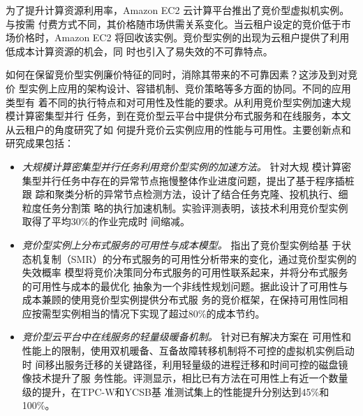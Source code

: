 \begin{cabstract}
  为了提升计算资源利用率，Amazon EC2 云计算平台推出了竞价型虚拟机实例。与按需
  付费方式不同，其价格随市场供需关系变化。当云租户设定的竞价低于市场价格时，Amazon 
  EC2 将回收该实例。竞价型实例的出现为云租户提供了利用低成本计算资源的机会，同
  时也引入了易失效的不可靠特点。

  如何在保留竞价型实例廉价特征的同时，消除其带来的不可靠因素？这涉及到对竞价
  型实例上应用的架构设计、容错机制、竞价策略等多方面的协同。不同的应用类型有
  着不同的执行特点和对可用性及性能的要求。从利用竞价型实例加速大规模计算密集型并行
  任务，到在竞价型云平台中提供分布式服务和在线服务，本文从云租户的角度研究了如
  何提升竞价云实例应用的性能与可用性。主要创新点和研究成果包括：
  \begin{itemize}
    \item \emph{大规模计算密集型并行任务利用竞价型实例的加速方法。} 针对大规
    模计算密集型并行任务中存在的异常节点拖慢整体作业进度问题，提出了基于程序插桩跟
    踪和聚类分析的异常节点检测方法，设计了结合任务克隆、投机执行、细粒度任务分割策
    略的执行加速机制。实验评测表明，该技术利用竞价型实例取得了平均30\%的作业完成时
    间缩减。
    \item \emph{竞价型实例上分布式服务的可用性与成本模型。} 指出了竞价型实例给基
    于状态机复制（SMR）的分布式服务的可用性分析带来的变化，通过竞价型实例的失效概率
    模型将竞价决策同分布式服务的可用性联系起来，并将分布式服务的可用性与成本的最优化
    抽象为一个非线性规划问题。据此设计了可用性与成本兼顾的使用竞价型实例提供分布式服
    务的竞价框架，在保持可用性同相应按需型实例相当的情况下实现了超过80\%的成本节约。
    \item \emph{竞价型云平台中在线服务的轻量级暖备机制。} 针对已有解决方案在
    可用性和性能上的限制，使用双机暖备、互备故障转移机制将不可控的虚拟机实例启动时
    间移出服务迁移的关键路径，利用轻量级的进程迁移和时间可控的磁盘镜像技术提升了服
    务性能。评测显示，相比已有方法在可用性上有近一个数量级的提升，在TPC-W和YCSB基
    准测试集上的性能提升分别达到45\%和100\%。
  \end{itemize}

\end{cabstract}


